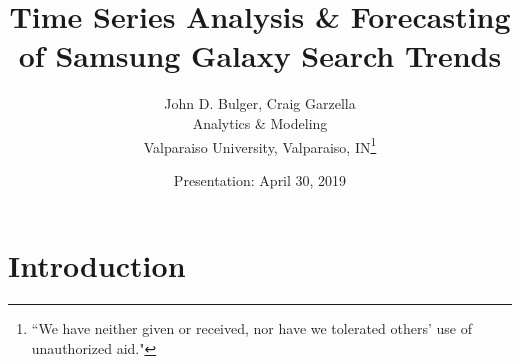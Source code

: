 \documentclass[12pt]{article}
\title{Time Series Analysis \& Forecasting of Samsung Galaxy Search Trends}
\author{John D. Bulger, Craig Garzella\\
	Analytics \& Modeling
	\\Valparaiso University, Valparaiso, IN\thanks{``We have neither given or received, nor have we tolerated others' use of unauthorized aid."}}
\date{Presentation: April 30, 2019}
\begin{document}
	\maketitle
	
	\section{Introduction}
	

\newpage
\begin{thebibliography}{3}
	
\end{thebibliography}

\newpage
\begin{appendices}	

\end{appendices}
\end{document}
